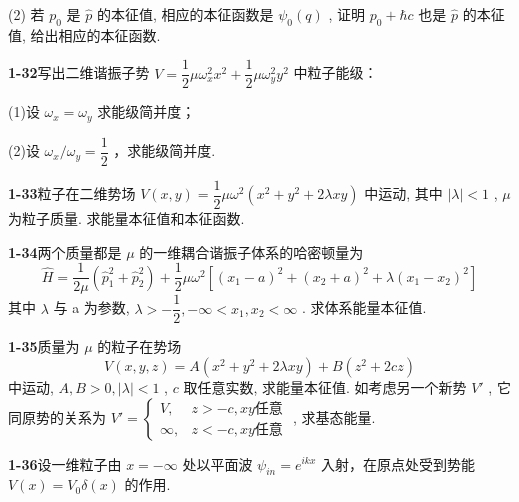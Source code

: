 (2) 若 $\displaystyle p_0$ 是 $\displaystyle \hat{p}$ 的本征值, 相应的本征函数是 $\displaystyle \psi_0(q)$ , 证明 $\displaystyle p_0 + \hbar c$ 也是 $\displaystyle \hat{p}$ 的本征值, 给出相应的本征函数.

\vfill

\newpage

\textbf{1-32}\quad 写出二维谐振子势 $\displaystyle V = \dfrac{1}{2}\mu \omega_x^2 x^2 +\dfrac{1}{2}\mu \omega_y^2 y^2$ 中粒子能级：

(1)设 $\displaystyle \omega_{x} = \omega_{y}$ 求能级简并度；

(2)设 $\displaystyle \omega_{x} / \omega_{y} = \dfrac{1}{2}$ ，求能级简并度.

\vfill

\newpage

\textbf{1-33}\quad 粒子在二维势场 $\displaystyle V(x, y) = \dfrac{1}{2} \mu \omega^2 (x^2 + y^2 + 2\lambda xy)$ 中运动, 其中 $\displaystyle \left|\lambda\right| < 1$ , $\displaystyle \mu$ 为粒子质量. 求能量本征值和本征函数.

\vfill

\newpage

\textbf{1-34}\quad 两个质量都是 $\displaystyle \mu$ 的一维耦合谐振子体系的哈密顿量为
$$
\hat {H} = \dfrac {1}{2 \mu} (\hat {p} _ {1} ^ {2} + \hat {p} _ {2} ^ {2}) + \dfrac {1}{2} \mu \omega^ {2} [ (x _ {1} - a) ^ {2} + (x _ {2} + a) ^ {2} + \lambda (x _ {1} - x _ {2}) ^ {2} ]
$$
其中 $\displaystyle \lambda$ 与 a 为参数, $\displaystyle \lambda > -\dfrac{1}{2}, -\infty < x_{1}, x_{2} < \infty$ . 求体系能量本征值.

\vfill

\newpage

\textbf{1-35}\quad 质量为 $\displaystyle \mu$ 的粒子在势场
$$
V (x, y, z) = A \left(x ^ {2} + y ^ {2} + 2 \lambda x y\right) + B \left(z ^ {2} + 2 c z\right)
$$
中运动, $\displaystyle A, B > 0, |\lambda| < 1$ , $\displaystyle c$ 取任意实数, 求能量本征值. 如考虑另一个新势 $\displaystyle V'$ , 它同原势的关系为 $\displaystyle V' = \begin{cases} V, & z > -c, xy \text{任意} \\ \infty, & z < -c, xy \text{任意} \end{cases}$ , 求基态能量.

\vfill

\newpage

\textbf{1-36}\quad 设一维粒子由 $\displaystyle x = -\infty$ 处以平面波 $\displaystyle \psi_{in} = e^{ikx}$ 入射，在原点处受到势能 $\displaystyle V(x) = V_0\delta (x)$ 的作用.

